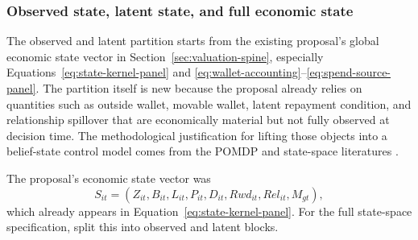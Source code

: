 \documentclass[11pt]{article}
\newcommand{\1}{\mathbf{1}}
\begin{document}
\subsubsection{Observed state, latent state, and full economic state}
\label{subsec:state-space-state-decomp}

The observed and latent partition starts from the existing proposal's global
economic state vector in Section~\ref{sec:valuation-spine}, especially
Equations~\eqref{eq:state-kernel-panel} and
\eqref{eq:wallet-accounting}--\eqref{eq:spend-source-panel}. The partition
itself is new because the proposal already relies on quantities such as outside
wallet, movable wallet, latent repayment condition, and relationship spillover
that are economically material but not fully observed at decision time. The
methodological justification for lifting those objects into a belief-state
control model comes from the POMDP and state-space literatures
\citep{smallwood1973pomdp,kaelbling1998pomdp,durbinkoopman2012ssm,
westharrison1997bfdm}.

The proposal's economic state vector was
\begin{equation}
  S_{it}
  =
  (Z_{it},B_{it},L_{it},P_{it},D_{it},Rwd_{it},Rel_{it},M_{gt}),
  \label{eq:ss-proposal-state-recall}
\end{equation}
which already appears in Equation~\eqref{eq:state-kernel-panel}. For the full
state-space specification, split this into observed and latent blocks.
\end{document}
